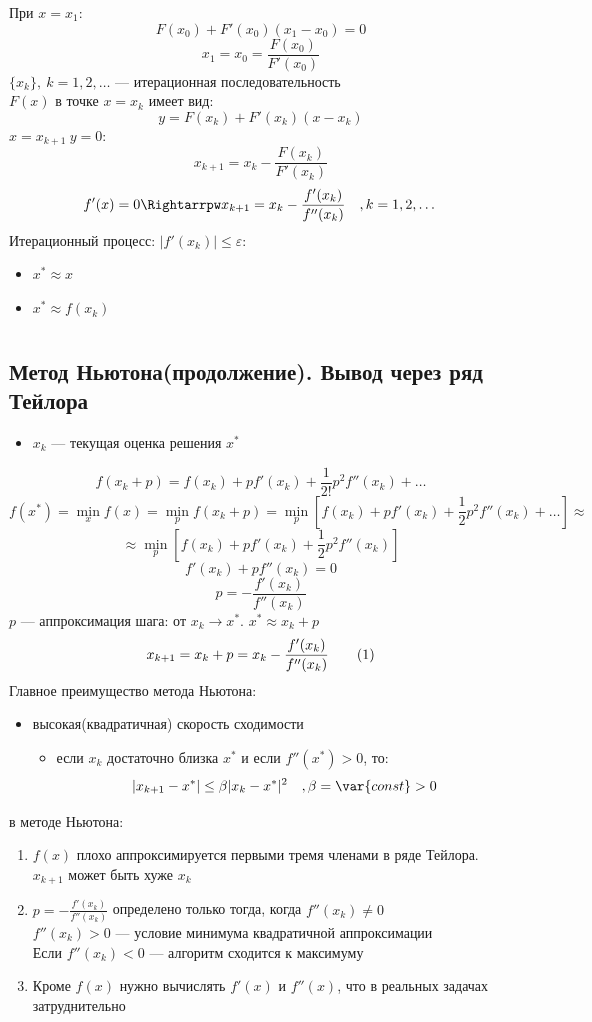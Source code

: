 \documentclass[oneside]{book}
\newcommand\addtag{\refstepcounter{equation}\tag{\theequation}}
\newcommand{\const}{\var{const}}
\theoremstyle{plain}
\theoremstyle{remark}
\theoremstyle{definition}
\begin{document}
При \(x = x_1\):
\[ F(x_0) + F'(x_0)(x_1 - x_0) = 0 \]
\[ x_1 = x_0 = \frac{F(x_0)}{F'(x_0)} \]
\(\{x_k\},\ k = 1, 2, \dots\) --- итерационная последовательность \\
\(F(x)\) в точке \(x = x_k\) имеет вид:
\[ y = F(x_k) + F'(x_k)(x - x_k) \]
\(x = x_{k + 1}\ y = 0\):
\[ x_{k+1} = x_k - \frac{F(x_k)}{F'(x_k)} \]
\[ f'(x) = 0 \Rightarrpw x_{k + 1} = x_k - \frac{f'(x_k)}{f''(x_k)}\quad,k=1,2,\dots \]
Итерационный процесс: \(|f'(x_k)| \le \varepsilon\):
\begin{itemize}
\item \(x^* \approx x\)
\item \(x^* \approx f(x_k)\)
\end{itemize}
\chapter{}
\label{sec:orge8d8664}
\section{Метод Ньютона(продолжение). Вывод через ряд Тейлора}
\label{sec:orgf918804}
\begin{itemize}
\item \(x_k\) --- текущая оценка решения \(x^*\)
\end{itemize}
\[ f(x_k + p) = f(x_k) + pf'(x_k) + \frac{1}{2!}p^2f''(x_k) + \dots \]
\[ f(x^*) = \min_x f(x) = \min_p f(x_k + p) = \min_p [ f(x_k) + pf'(x_k) + \frac{1}{2}p^2 f''(x_k)  + \dots ] \approx \]
\[ \approx \min_p[f(x_k) + pf'(x_k) + \frac{1}{2}p^2 f''(x_k)] \]
\[ f'(x_k) + pf''(x_k) = 0 \]
\[ p = -\frac{f'(x_k)}{f''(x_k)} \]
\(p\) --- аппроксимация шага: от \(x_k \to x^*\). \(x^* \approx x_k + p\)
\[ x_{k + 1} = x_k + p = x_k - \frac{f'(x_k)}{f''(x_k)} \label{nuton_1_5}\addtag \]
Главное преимущество метода Ньютона:
\begin{itemize}
\item высокая(квадратичная) скорость сходимости
\begin{itemize}
\item если \(x_k\) достаточно близка \(x^*\) и если \(f''(x^*) > 0\), то:
\[ |x_{k+1} - x^*| \le \beta|x_k - x^*|^2\quad, \beta = \const > 0 \]
\end{itemize}
\end{itemize}

 в методе Ньютона:
\begin{enumerate}
\item \(f(x)\) плохо аппроксимируется первыми тремя членами в ряде Тейлора. \(x_{k+1}\) может быть хуже \(x_k\)
\item \(p=-\frac{f'(x_k)}{f''(x_k)}\) определено только тогда, когда \(f''(x_k)\neq0\) \\
\(f''(x_k) > 0\) --- условие минимума квадратичной аппроксимации \\
Если \(f''(x_k) < 0\) --- алгоритм сходится к максимуму
\item Кроме \(f(x)\) нужно вычислять \(f'(x)\) и \(f''(x)\), что в реальных задачах затруднительно
\end{enumerate}
\end{document}
